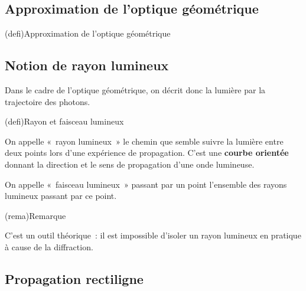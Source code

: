 \documentclass[../../main/main.tex]{subfiles}
\begin{document}
\subsection{Approximation de l'optique géométrique}

\begin{tcb}[label=def:optgeo](defi){Approximation de l'optique géométrique}
\end{tcb}

\subsection{Notion de rayon lumineux}

Dans le cadre de l'optique géométrique, on décrit donc la lumière par la
trajectoire des photons.

\begin{tcbraster}[raster columns=3, raster equal height=rows]
	\begin{tcb}[label=def:rl, raster multicolumn=2](defi){Rayon et faisceau lumineux}

		On appelle «~rayon lumineux~» le chemin que semble suivre la lumière
		entre deux points lors d'une expérience de propagation. C'est une
		\textbf{courbe orientée} donnant la direction et le sens de propagation
		d'une onde lumineuse.\bigbreak

		On appelle «~faisceau lumineux~» passant
		par un point l'ensemble des rayons lumineux passant par ce point.

	\end{tcb}
	\begin{tcb}(rema){Remarque}

		C'est un outil théorique~: il est impossible d'isoler un rayon lumineux
		en pratique à cause de la diffraction.

	\end{tcb}
\end{tcbraster}

\subsection{Propagation rectiligne}
\end{document}

